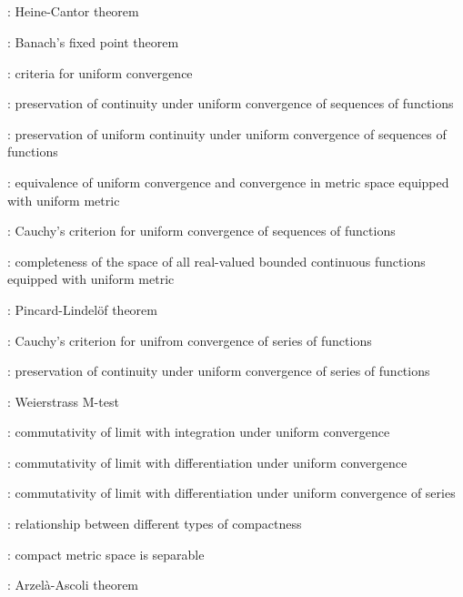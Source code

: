 \subsection*{}
\item {}: Heine-Cantor theorem
\item {}: Banach's fixed point theorem
\item {}: criteria for uniform convergence
\item {}: preservation of continuity under uniform convergence of sequences of functions
\item {}: preservation of uniform continuity under uniform convergence of sequences of functions
\item {}: equivalence of uniform convergence and convergence in metric space equipped with uniform metric
\item {}: Cauchy's criterion for uniform convergence of sequences of functions
\item {}: completeness of the space of all real-valued bounded continuous functions equipped with uniform metric
\item {}: Pincard-Lindel\"of theorem
\item {}: Cauchy's criterion for unifrom convergence of series of functions
\item {}: preservation of continuity under uniform convergence of series of functions
\item {}: Weierstrass M-test
\item {}: commutativity of limit with integration under uniform convergence
\item {}: commutativity of limit with differentiation under uniform convergence
\item {}: commutativity of limit with differentiation under uniform convergence of series
\item {}: relationship between different types of compactness
\item {}: compact metric space is separable
\item {}: Arzel\`a-Ascoli theorem

